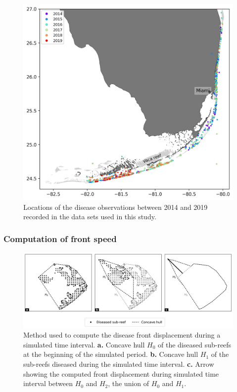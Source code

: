 \begin{figure}
    \center
    \includegraphics[width=.8\textwidth]{chapters/sctld/figures/monitoring.jpg}
    \caption{Locations of the disease observations between 2014 and 2019 recorded in the data sets used in this study.}
    \label{fig:stns}
\end{figure}

\subsubsection{Computation of front speed}

\begin{figure}
    \centering
    \includegraphics[width=.99\linewidth]{chapters/sctld/figures/hull_example.png}
    \caption{Method used to compute the disease front displacement during a simulated time interval. \textbf{a.} Concave hull $H_0$ of the diseased sub-reefs at the beginning of the simulated period.  \textbf{b.} Concave hull $H_1$ of the sub-reefs diseased during the simulated time interval. \textbf{c.} Arrow showing the computed front displacement during simulated time interval between $H_0$ and $H_2$, the union of $H_0$ and $H_1$.}
    \label{fig:hull}
\end{figure}

